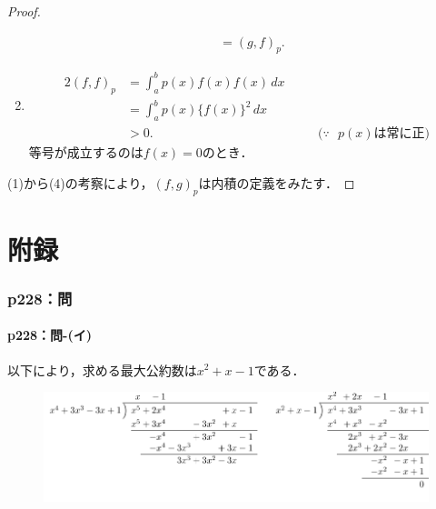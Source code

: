 \documentclass[a4paper,10pt,fleqn]{ltjsarticle}
\begin{document}
\begin{tleftbar}
\begin{proof}
\begin{enumerate}[(1)]
\begin{align*}
                              & =(g,f)_p .
                  \end{align*}
            \item
                  \begin{alignat*}{2}
                      (f,f)_p & = \int_{a}^{b} p(x) f(x) f(x) \, dx   &       &                                 \\
                              & =\int_{a}^{b} p(x) \{ f(x) \}^2 \, dx &       &                                 \\
                              & >0.                                   & \quad & \text{($\because$~ $p(x)$は常に正)}
                  \end{alignat*}
                  等号が成立するのは$f(x)=0$のとき．
        \end{enumerate}
        (1)から(4)の考察により，$(f,g)_p$は内積の定義をみたす．
    \end{proof}
\end{tleftbar}

\newpage

\part*{附録\three}


\section*{p228：問}

\subsection*{p228：問-(イ)}
以下により，求める最大公約数は$x^2+x-1$である．

\begin{figure}[ht]
    \centering
    \includegraphics{emath_figures/p228_toi_i.pdf}
\end{figure}
\end{document}
